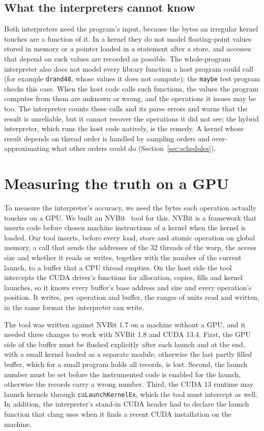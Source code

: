 \documentclass[11pt]{article}
\newcommand{\secref}[1]{Section~\ref{#1}}
\newcommand{\code}[1]{\texttt{#1}}
\begin{document}
\subsection{What the interpreters cannot know}
\label{sec:unknown}

Both interpreters need the program's input, because the bytes an irregular kernel touches are a function of it. In
a kernel they do not model floating-point values stored in memory or a pointer loaded in a statement after a store,
and accesses that depend on such values are recorded as possible. The whole-program interpreter also does not model
every library function a host program could call (for example \code{drand48}, whose values it does not compute);
the \code{maybe} test program checks this case. When the host code calls such functions, the values the program
computes from them are unknown or wrong, and the operations it issues may be too. The interpreter counts these calls
and its parse errors and warns that the result is unreliable, but it cannot recover the operations it did not see;
the hybrid interpreter, which runs the host code natively, is the remedy. A kernel whose result depends on thread
order is handled by sampling orders and over-approximating what other orders could do (\secref{sec:schedules}).

\section{Measuring the truth on a GPU}
\label{sec:truth}

To measure the interpreter's accuracy, we need the bytes each operation actually touches on a GPU. We built an
NVBit~\cite{Villa2019NVBit} tool for this. NVBit is a framework that inserts code before chosen machine
instructions of a kernel when the kernel is loaded. Our tool inserts, before every load, store and atomic
operation on global memory, a call that sends the addresses of the 32 threads of the warp, the access size and
whether it reads or writes, together with the number of the current launch, to a buffer that a CPU thread empties.
On the host side the tool intercepts the CUDA driver's functions for allocation, copies, fills and kernel launches,
so it knows every buffer's base address and size and every operation's position. It writes, per operation and
buffer, the ranges of units read and written, in the same format the interpreter can write.

The tool was written against NVBit 1.7 on a machine without a GPU, and it needed three changes to work with NVBit
1.8 and CUDA 13.4. First, the GPU side of the buffer must be flushed explicitly after each launch and at the end,
with a small kernel loaded as a separate module, otherwise the last partly filled buffer, which for a small program
holds all records, is lost. Second, the launch number must be set before the instrumented code is enabled for the
launch, otherwise the records carry a wrong number. Third, the CUDA 13 runtime may launch kernels through
\code{cuLaunchKernelEx}, which the tool must intercept as well. In addition, the interpreter's stand-in CUDA header had to declare the launch function
that clang uses when it finds a recent CUDA installation on the machine.
\end{document}
